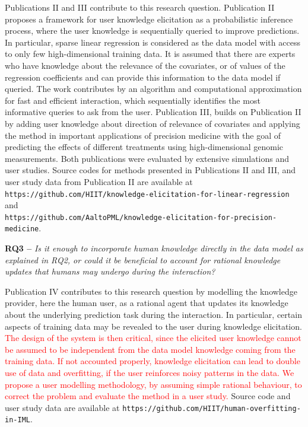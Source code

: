 \documentclass[dissertation,math,vertlayout,pdfa,colorlinks]{aaltoseries}
\begin{document}
Publications II and III contribute to this research question. Publication II proposes a framework for user knowledge elicitation as a probabilistic inference process, where the user knowledge is sequentially queried to improve predictions. In particular, sparse linear regression is considered as the data model with access to only few high-dimensional training data. It is assumed that there are experts who have knowledge about the relevance of the covariates, or of values of the regression coefficients and can provide this information to the data model if queried. The work contributes by an algorithm and computational approximation for fast and efficient interaction, which sequentially identifies the most informative queries to ask from the user. Publication III, builds on Publication II by adding user knowledge about direction of relevance of covariates and applying the method in important applications of precision medicine with the goal of predicting the effects of different treatments using high-dimensional genomic measurements. Both publications were evaluated by extensive simulations and user studies. 
Source codes for methods presented in Publications II and III, and user study data from Publication II are available at \\ \texttt{https://github.com/HIIT/knowledge-elicitation-for-linear-regression} and \\ \texttt{https://github.com/AaltoPML/knowledge-elicitation-for-precision-medicine}.




\noindent \textbf{RQ3 --} \textit{Is it enough to incorporate human knowledge directly in the data model as explained in RQ2, or could it be beneficial to account for rational knowledge updates that humans may undergo during the interaction?}

Publication IV contributes to this research question by modelling the knowledge provider, here the human user, as a rational agent that updates its knowledge about the underlying prediction task during the interaction. In particular, certain aspects of training data may be revealed to the user during knowledge elicitation. \textcolor{red}{The design of the system is then critical, since the elicited user knowledge cannot be assumed to be independent from the data model knowledge coming from the training data. If not accounted properly, knowledge elicitation can lead to double use of data and overfitting, if the user reinforces noisy patterns in the data. We propose a user modelling methodology, by assuming simple rational behaviour, to correct the problem and evaluate the method in a user study.} 
Source code and user study data are available at \texttt{https://github.com/HIIT/human-overfitting-in-IML}.
\end{document}
